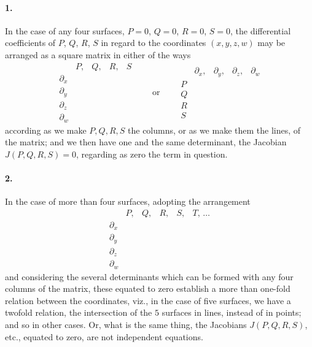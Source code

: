 \documentclass[11pt,a4paper]{article}
\begin{document}
\paragraph{1.}
In the case of any four surfaces, $P = 0$, $Q = 0$, $R = 0$, $S = 0$, the differential
coefficients of $P$, $Q$, $R$, $S$ in regard to the coordinates $(x, y, z, w)$ may be
arranged as a square matrix in either of the ways
\[
\begin{array}{c|cccc}
 & P, & Q, & R, & S \\\hline
\partial_x & & & & \\
\partial_y & & & & \\
\partial_z & & & & \\
\partial_w & & & &
\end{array}
\qquad\text{or}\qquad
\begin{array}{c|cccc}
 & \partial_x, & \partial_y, & \partial_z, & \partial_w \\\hline
P & & & & \\
Q & & & & \\
R & & & & \\
S & & & &
\end{array}
\]
according as we make $P, Q, R, S$ the columns, or as we make them the lines, of the matrix;
and we then have one and the same determinant, the Jacobian $J(P, Q, R, S) = 0$, regarding
as zero the term in question.

\paragraph{2.}
In the case of more than four surfaces, adopting the arrangement
\[
\begin{array}{c|ccccc}
 & P, & Q, & R, & S, & T,\,\ldots \\\hline
\partial_x & & & & & \\
\partial_y & & & & & \\
\partial_z & & & & & \\
\partial_w & & & & &
\end{array}
\]
and considering the several determinants which can be formed with any four columns of
the matrix, these equated to zero establish a more than one-fold relation between the
coordinates, viz., in the case of five surfaces, we have a twofold relation, the
intersection of the $5$ surfaces in lines, instead of in points; and so in other cases.
Or, what is the same thing, the Jacobians $J(P, Q, R, S)$, etc., equated to zero, are
not independent equations.
\end{document}
